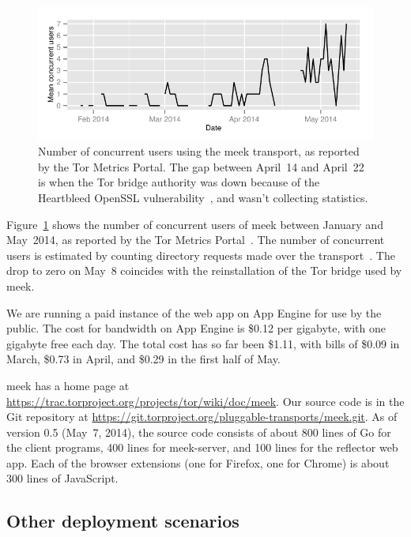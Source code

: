 \documentclass{article}
\def\meekserver{\mbox{meek-server}}
\begin{document}
\begin{figure}
\includegraphics[width=\linewidth]{clients-meek}
\caption{Number of concurrent users using the meek transport,
as reported by the Tor Metrics Portal.
The gap between April~14 and April~22 is when the Tor bridge authority
was down because of the Heartbleed OpenSSL vulnerability~\cite{heartbleed}, and wasn't collecting statistics.}
\label{fig:clients}
\end{figure}

Figure~\ref{fig:clients} shows the number of concurrent users of meek between January and May~2014,
as reported by the Tor Metrics Portal~\cite{metrics-meek}.
The number of concurrent users is estimated by counting directory requests made over the transport~\cite{counting-daily-bridge-users}.
The drop to zero on May~8 coincides with the reinstallation of the Tor bridge used by meek.

We are running a paid instance of the web app on App Engine for use by the public.
The cost for bandwidth on App Engine is \$0.12 per gigabyte,
with one gigabyte free each day.
The total cost has so far been \$1.11, with bills of
\$0.09 in March,
\$0.73 in April,
and \$0.29 in the first half of May.

meek has a home page at
\url{https://trac.torproject.org/projects/tor/wiki/doc/meek}.
Our source code is in the Git repository at
\url{https://git.torproject.org/pluggable-transports/meek.git}.
As of version 0.5 (May~7, 2014), the source code consists of
about 800 lines of Go for the client programs,
400 lines for \meekserver, and
100 lines for the reflector web app.
Each of the browser extensions
(one for Firefox, one for Chrome)
is about 300 lines of JavaScript.


\subsection{Other deployment scenarios}
\label{sec:otherdeployment}
\end{document}
